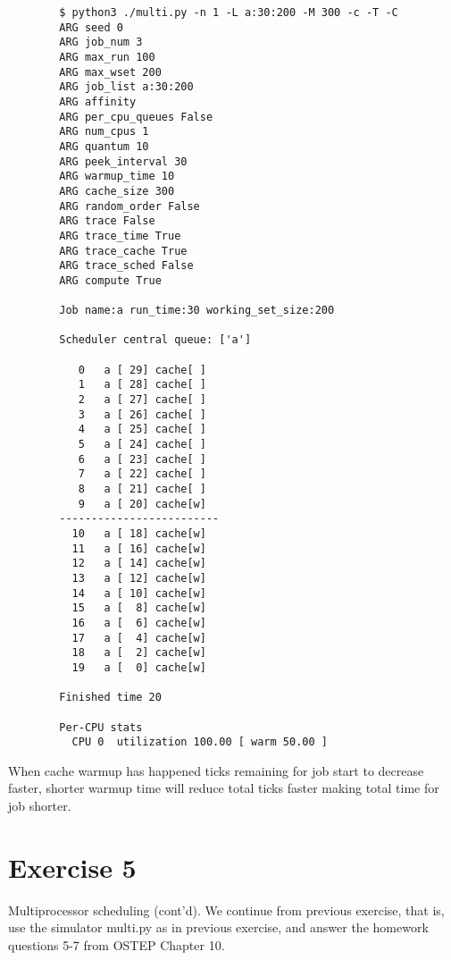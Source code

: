 \documentclass{article}
\newcommand{\exercise}[1]{
    \section*{Exercise #1}
    \markboth{Exercise #1}{}
}
\begin{document}
\begin{enumerate}[label=\textbf{\arabic*}), start=1]
    {\scriptsize
    \begin{verbatim}
        $ python3 ./multi.py -n 1 -L a:30:200 -M 300 -c -T -C
        ARG seed 0
        ARG job_num 3
        ARG max_run 100
        ARG max_wset 200
        ARG job_list a:30:200
        ARG affinity 
        ARG per_cpu_queues False
        ARG num_cpus 1
        ARG quantum 10
        ARG peek_interval 30
        ARG warmup_time 10
        ARG cache_size 300
        ARG random_order False
        ARG trace False
        ARG trace_time True
        ARG trace_cache True
        ARG trace_sched False
        ARG compute True
        
        Job name:a run_time:30 working_set_size:200
        
        Scheduler central queue: ['a']
        
           0   a [ 29] cache[ ]     
           1   a [ 28] cache[ ]     
           2   a [ 27] cache[ ]     
           3   a [ 26] cache[ ]     
           4   a [ 25] cache[ ]     
           5   a [ 24] cache[ ]     
           6   a [ 23] cache[ ]     
           7   a [ 22] cache[ ]     
           8   a [ 21] cache[ ]     
           9   a [ 20] cache[w]     
        -------------------------
          10   a [ 18] cache[w]     
          11   a [ 16] cache[w]     
          12   a [ 14] cache[w]     
          13   a [ 12] cache[w]     
          14   a [ 10] cache[w]     
          15   a [  8] cache[w]     
          16   a [  6] cache[w]     
          17   a [  4] cache[w]     
          18   a [  2] cache[w]     
          19   a [  0] cache[w]     
        
        Finished time 20
        
        Per-CPU stats
          CPU 0  utilization 100.00 [ warm 50.00 ]
    \end{verbatim}
    }
    When cache warmup has happened ticks remaining for job start to
    decrease faster, shorter warmup time will reduce total ticks faster
    making total time for job shorter.
\end{enumerate}
\newpage

\exercise{5} 
Multiprocessor scheduling (cont’d). We continue from previous exercise,
that is, use the simulator multi.py as in previous exercise, and
answer the homework questions 5-7 from OSTEP Chapter 10.
\end{document}
